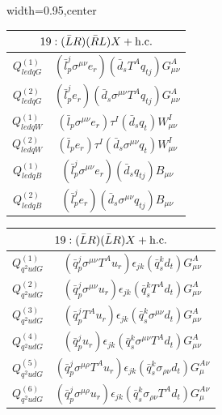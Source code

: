 \begin{table}[H]
\begin{center}
\begin{adjustbox}{width=0.95\textwidth,center}
\small
\begin{minipage}[t]{5.7cm}
\renewcommand{\arraystretch}{1.5}
\begin{tabular}[t]{c|c}
\multicolumn{2}{c}{\boldmath$19:(\bar L R)(\bar R L)X + \mathrm{h.c.}$} \\
\hline
$Q_{ledqG}^{(1)}$ & $(\bar l_p^j \sigma^{\mu\nu} e_r) (\bar d_s T^A q_{tj}) G^A_{\mu\nu}$ \\
%
$Q_{ledqG}^{(2)}$ & $(\bar l_p^j e_r) (\bar d_s \sigma^{\mu\nu} T^A q_{tj}) G^A_{\mu\nu}$ \\
%
$Q_{ledqW}^{(1)}$ & $(\bar l_p \sigma^{\mu\nu} e_r) \tau^I (\bar d_s q_t)  W^I_{\mu\nu}$ \\
%
$Q_{ledqW}^{(2)}$ & $(\bar l_p e_r) \tau^I (\bar d_s \sigma^{\mu\nu} q_t) W^I_{\mu\nu}$ \\
%
$Q_{ledqB}^{(1)}$ & $(\bar l_p^j \sigma^{\mu\nu} e_r) (\bar d_s q_{tj}) B_{\mu\nu}$ \\
%
$Q_{ledqB}^{(2)}$ & $(\bar l_p^j e_r) (\bar d_s \sigma^{\mu\nu} q_{tj}) B_{\mu\nu}$
\end{tabular}
\end{minipage}
\hspace{1cm}
\begin{minipage}[t]{7.6cm}
\renewcommand{\arraystretch}{1.5}
\begin{tabular}[t]{c|c}
\multicolumn{2}{c}{\boldmath$19:(\bar L R)(\bar L R)X + \mathrm{h.c.}$} \\
\hline
$Q_{q^2udG}^{(1)}$  &  $(\bar q_p^j \sigma^{\mu\nu} T^A u_r) \epsilon_{jk} (\bar q_s^k d_t) G^A_{\mu\nu}$ \\
%
$Q_{q^2udG}^{(2)}$  &  $(\bar q_p^j \sigma^{\mu\nu} u_r) \epsilon_{jk} (\bar q_s^k T^A d_t) G^A_{\mu\nu}$ \\
%
$Q_{q^2udG}^{(3)}$  &  $(\bar q_p^j T^A u_r) \epsilon_{jk} (\bar q_s^k \sigma^{\mu\nu} d_t) G^A_{\mu\nu}$ \\
%
$Q_{q^2udG}^{(4)}$  &  $(\bar q_p^j u_r) \epsilon_{jk} (\bar q_s^k \sigma^{\mu\nu} T^A d_t) G^A_{\mu\nu}$ \\
%
$Q_{q^2udG}^{(5)}$  &  $(\bar q_p^j \sigma^{\mu\rho} T^A u_r) \epsilon_{jk} (\bar q_s^k \sigma_{\rho\nu} d_t) G_\mu^{A\nu}$ \\
%
$Q_{q^2udG}^{(6)}$  &  $(\bar q_p^j \sigma^{\mu\rho} u_r) \epsilon_{jk} (\bar q_s^k \sigma_{\rho\nu} T^A d_t) G_\mu^{A\nu}$ \\

\end{tabular}
\end{minipage}
\end{adjustbox}
\end{center}
\end{table}
